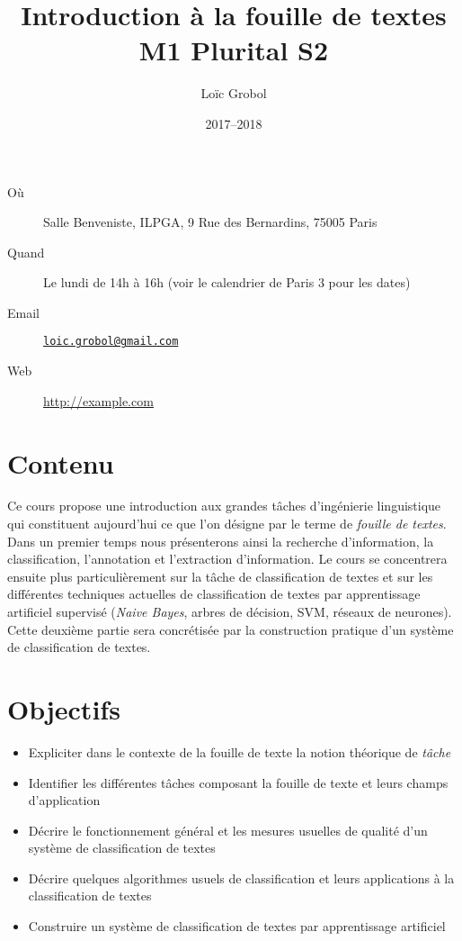 \documentclass[a4, 11pt]{article}
\title{Introduction à la fouille de textes\\M1 Plurital S2}
\author{Loïc Grobol}
\date{2017–2018}
\begin{document}
\vspace*{-7em}
{\let\newpage\relax\maketitle}
\thispagestyle{main}

\begin{description}
    \item[Où] Salle Benveniste, ILPGA, 9 Rue des Bernardins, 75005 Paris
    \item[Quand] Le lundi de 14h à 16h (voir le calendrier de Paris 3 pour les dates)
    \item[Email] \href{mailto:loic.grobol@gmail.com}{\texttt{loic.grobol@gmail.com}}
    \item[Web] \url{http://example.com}
\end{description}

\section*{Contenu}
Ce cours propose une introduction aux grandes tâches d'ingénierie linguistique qui constituent aujourd'hui ce que l'on désigne par le terme de \emph{fouille de textes}.
Dans un premier temps nous présenterons ainsi la recherche d'information, la classification, l'annotation et l'extraction d'information.
Le  cours se  concentrera ensuite plus particulièrement sur la tâche de classification de textes et sur les différentes techniques actuelles de classification de textes par apprentissage artificiel supervisé (\emph{Naive Bayes}, arbres de décision, SVM, réseaux de neurones).
Cette deuxième partie sera concrétisée par la construction pratique d'un système de classification de textes.

\section*{Objectifs}

\begin{itemize}
    \item Expliciter dans le contexte de la fouille de texte la notion théorique de \emph{tâche}
    \item Identifier les différentes tâches composant la fouille de texte et leurs champs d'application
    \item Décrire le fonctionnement général et les mesures usuelles de qualité d'un système de classification de textes
    \item Décrire quelques algorithmes usuels de classification et leurs applications à la classification de textes
    \item Construire un système de classification de textes par apprentissage artificiel
\end{itemize}
\end{document}
